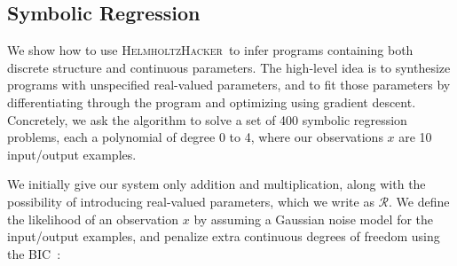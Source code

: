 \documentclass{article}
\newcommand{\system}{\textsc{HelmholtzHacker}~}
\newcommand{\probability}{\mathds{P}} %
\begin{document}
\subsection{Symbolic Regression}\label{regressionSection}
We show how to use \system to infer programs containing both discrete
structure and continuous parameters. The high-level idea is to synthesize programs with unspecified real-valued parameters, and to fit those parameters by differentiating through the program
and optimizing using gradient descent.
Concretely, we ask the algorithm to
solve a set of 400 symbolic regression problems, each a polynomial of
degree 0 to 4, where our observations $x$ are 10
input/output examples.%

We initially give our system only addition and multiplication,
along with the possibility of introducing real-valued parameters, which we write as $\mathcal{R}$.
We define the likelihood of an observation $x$ by assuming a Gaussian noise model for the input/output examples,
and penalize extra continuous degrees of freedom using the BIC~\cite{Bishop:2006:PRM:1162264}:


\end{document}
